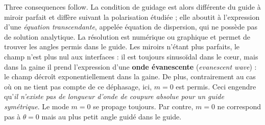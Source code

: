 Three consequences follow. La condition de guidage est alors différente du
guide à miroir parfait et diffère suivant la polarisation étudiée ; elle
aboutit à l'expression d'une \emph{équation transcendante}, appelée équation
de dispersion, qui ne possède pas de solution analytique. La résolution est
numérique ou graphique et permet de trouver les angles permis dans le guide.
Les miroirs n'étant plus parfaits, le champ n'est plus nul aux interfaces : il
est toujours sinusoïdal dans le cœur, mais dans la gaine il prend l'expression
d'une \textbf{onde évanescente} (\textit{evanescent wave}) : le champ décroît
exponentiellement dans la gaine. De plus, contrairement au cas où on ne tient
pas compte de ce déphasage, ici, $m = 0$ est permis. Ceci engendre qu'\emph{il
n'existe pas de longueur d'onde de coupure absolue pour un guide symétrique}.
Le mode $m=0$ se propage toujours. Par contre, $m = 0$ ne correspond pas à
$\theta = 0$ mais au plus petit angle guidé dans le guide.

